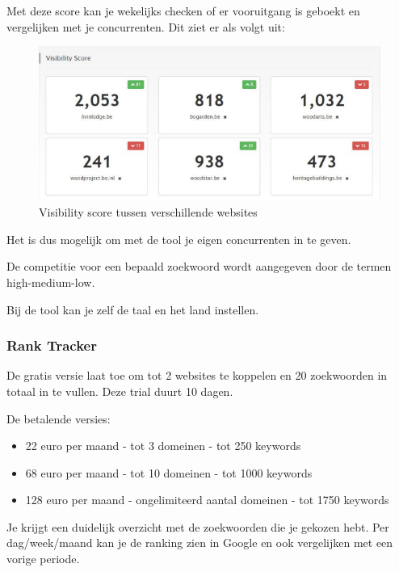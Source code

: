 Met deze score kan je wekelijks checken of er vooruitgang is geboekt en vergelijken met je concurrenten. Dit ziet er als volgt uit: 

\begin{figure}[h!]
\centering
\includegraphics[width=\linewidth]{img/awrcloudvisibility.PNG}
\caption{Visibility score tussen verschillende websites
\autocite{awrcloud}}
\end{figure}

Het is dus mogelijk om met de tool je eigen concurrenten in te geven.

De competitie voor een bepaald zoekwoord wordt aangegeven door de termen high-medium-low. 

Bij de tool kan je zelf de taal en het land instellen. 

\subsubsection{Rank Tracker}
\label{ch: Rank Tracker}

De gratis versie laat toe om tot 2 websites te koppelen en 20 zoekwoorden in totaal in te vullen. Deze trial duurt 10 dagen. 

De betalende versies: 
\begin{itemize}
\item 22 euro per maand - tot 3 domeinen - tot 250 keywords
\item 68 euro per maand - tot 10 domeinen - tot 1000 keywords
\item 128 euro per maand - ongelimiteerd aantal domeinen - tot 1750 keywords
\end{itemize}

Je krijgt een duidelijk overzicht met de zoekwoorden die je gekozen hebt. Per dag/week/maand kan je de ranking zien in Google en ook vergelijken met een vorige periode. 

